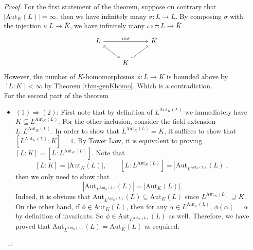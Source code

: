 \documentclass[11pt]{book}
\begin{document}
\begin{proof}
    For the first statement of the theorem, suppose on contrary that $|\mathrm{Aut}_{K}(L)|=\infty$, then we have infinitely many $\sigma:L\rightarrow L$. By composing $\sigma$ with the injection $\iota: L \to \overline{K}$, we have infinitely many $\iota \circ \tau:L\rightarrow \bar{K}$ \[\begin{tikzcd}
	L && {\bar{K}} \\
	& K
	\arrow["\iota \circ \sigma", from=1-1, to=1-3]
	\arrow[hook', from=2-2, to=1-1]
	\arrow[hook, from=2-2, to=1-3]
\end{tikzcd}\]
    However, the number of $K$-homomorphisms $\phi: L \to \overline{K}$ is bounded above by $[L:K] < \infty$ by Theorem \ref{thm-genKhomo}. Which is a contradiction.\\
    
    For the second part of the theorem
    \begin{itemize}
        \item $(1)\Rightarrow(2)$: First note that by definition of $L^{\mathrm{Aut}_{K}(L)}$ we immediately have $K\subseteq L^{\mathrm{Aut}_{K}(L)}$, For the other inclusion, consider the field extension $L:L^{\mathrm{Aut}_{K}(L)}$. In order to show that $L^{\mathrm{Aut}_{K}(L)}=K$, it suffices to show that $[L^{\mathrm{Aut}_{K}(L)}:K] = 1$. By Tower Law, it is equivalent to proving $[L:K]=[L:L^{\mathrm{Aut}_{K}(L)}]$. Note that 
        $$[L:K]=|\mathrm{Aut}_{K}(L)|,\quad \quad [L:L^{\mathrm{Aut}_{K}(L)}]=|\mathrm{Aut}_{ L^{\mathrm{Aut}_{K}(L)}}(L)|,$$ then we only need to show that
$$|\mathrm{Aut}_{L^{\mathrm{Aut}_{K}(L)}}(L)|= |\mathrm{Aut}_{K}(L)|.$$ 
        Indeed, it is obvious that
    $\mathrm{Aut}_{L^{\mathrm{Aut}_{K}(L)}}(L)\subseteq \mathrm{Aut}_{K}(L)$ since $L^{\mathrm{Aut}_{K}(L)} \supseteq K$. On the other hand, if $\phi \in \mathrm{Aut}_{K}(L)$, then for any $\alpha \in L^{\mathrm{Aut}_{K}(L)}$, $\phi(\alpha) = \alpha$ by definition of invariants. So $\phi \in \mathrm{Aut}_{L^{\mathrm{Aut}_{K}(L)}}(L)$ as well. Therefore, we have proved that  $\mathrm{Aut}_{L^{\mathrm{Aut}_{K}(L)}}(L) = \mathrm{Aut}_{K}(L)$
    as required.    
        

\end{itemize}
\end{proof}
\end{document}
